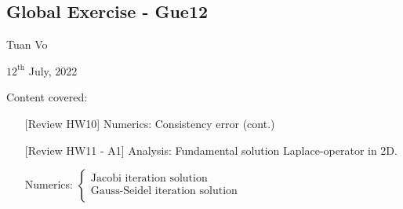 \documentclass[12pt]{article}
\begin{document}
\begin{center}
	\section*{Global Exercise - Gue12}
\end{center}
\begin{center}
	Tuan Vo
\end{center}
\begin{center}
	$12^{\text{th}}$ July, 2022
\end{center}
Content covered:
\begin{itemize}
	\item[\checkmark] [Review HW10] Numerics: Consistency error (cont.)
	\item[\checkmark] [Review HW11 - A1] Analysis: Fundamental solution Laplace-operator in 2D.
	\item[\checkmark] Numerics:
	      $
		      \begin{cases}
			      \text{Jacobi iteration solution		}       \\
			      \text{Gauss-Seidel iteration solution		} \\
		      \end{cases}
	      $
\end{itemize}
\end{document}
